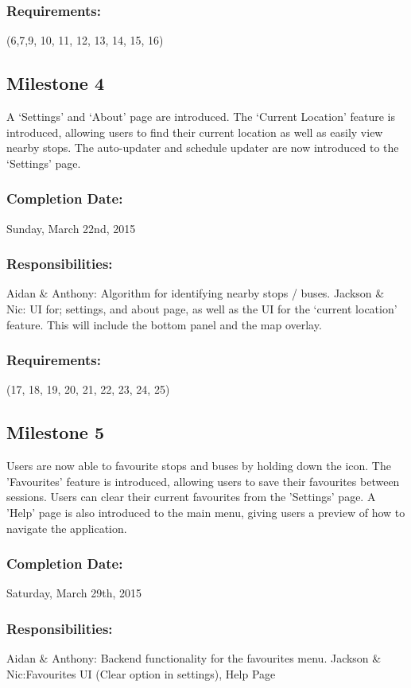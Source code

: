 \documentclass[a4paper,12pt]{article}
\begin{document}
\subsubsection{Requirements:} (6,7,9, 10, 11, 12, 13, 14, 15, 16)

\subsection{Milestone 4}
A ‘Settings’ and ‘About’ page are introduced. The ‘Current Location’ feature is introduced, allowing users to find their current location as well as easily view nearby stops. The auto-updater and schedule updater are now introduced to the ‘Settings’ page.
\subsubsection{Completion Date:} Sunday, March 22nd, 2015
\subsubsection{Responsibilities:}
Aidan \& Anthony: Algorithm for identifying nearby stops / buses.
Jackson \& Nic: UI for; settings, and about page, as well as the UI for the ‘current location’ feature. This will include the bottom panel and the map overlay.
\subsubsection{Requirements:} (17, 18, 19, 20, 21, 22, 23, 24, 25)
\pagebreak

\subsection{Milestone 5}
Users are now able to favourite stops and buses by holding down the icon. The 'Favourites' feature is introduced, allowing users to save their favourites between sessions. Users can clear their current favourites from the 'Settings' page. A 'Help' page is also introduced to the main menu, giving users a preview of how to navigate the application.
\subsubsection{Completion Date:} Saturday, March 29th, 2015
\subsubsection{Responsibilities:}
	Aidan \& Anthony: Backend functionality for the favourites menu.
Jackson \& Nic:Favourites UI (Clear option in settings), Help Page
\end{document}
